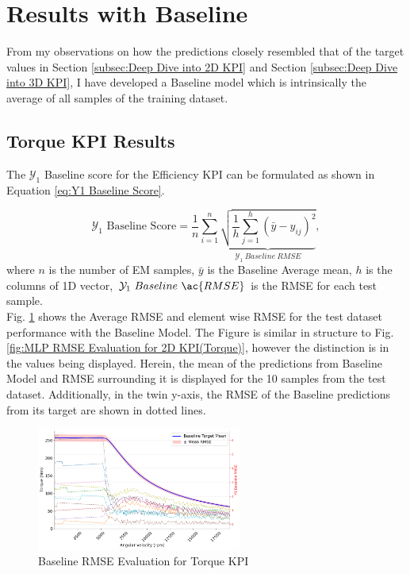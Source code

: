 \documentclass{report} %
\begin{document}
\section{Results with Baseline}\label{sec:Results with Baseline}

From my observations on how the predictions closely resembled that of the target values in Section \ref{subsec:Deep Dive into 2D KPI} and 
Section \ref{subsec:Deep Dive into 3D KPI}, I have developed a Baseline model which is intrinsically the average of all samples of the training dataset.

\subsection{Torque KPI Results}\label{subsec:Torque KPI Results with Baseline}

The $\mathcal{Y}_1$ Baseline score for the Efficiency \ac{KPI} can be formulated as shown in Equation \ref{eq:Y1 Baseline Score}.

\begin{equation}
    \text{$\mathcal{Y}_1$ Baseline Score} = \frac{1}{n} \sum_{i=1}^{n} \underbrace{ \sqrt{\frac{1}{h} \sum_{j=1}^{h} (\bar{y} - y_{ij})^2}}_{\mathcal{Y}_1\ Baseline\ RMSE},
    \label{eq:Y1 Baseline Score}
\end{equation}
where \(n\) is the number of \ac{EM} samples, \(\bar{y}\) is the Baseline Average mean, \(h\) is the columns of 1D vector, \(\mathcal{Y}_1\ Baseline\ \ac{RMSE}\) is the \ac{RMSE} for each test sample.\\

Fig. \ref{fig:Baseline RMSE Evaluation for 2D KPI(Torque)} shows the Average \ac{RMSE} and element wise \ac{RMSE} for the test dataset performance with the 
Baseline Model. The Figure is similar in structure to Fig. \ref{fig:MLP RMSE Evaluation for 2D KPI(Torque)}, however the distinction is in the values being displayed. 
Herein, the mean of the predictions from Baseline Model and \ac{RMSE} surrounding it is displayed for the 10 samples from the test dataset. Additionally, in the twin 
y-axis, the \ac{RMSE} of the Baseline predictions from its target are shown in dotted lines.

\begin{figure}[H]
    \centering
    \includegraphics[width=0.6\textwidth]{./ReportImages/RMSE_Baseline_y1.png} 
    \caption{Baseline \ac{RMSE} Evaluation for Torque \ac{KPI}} 
    \label{fig:Baseline RMSE Evaluation for 2D KPI(Torque)}
\end{figure}
\end{document}
